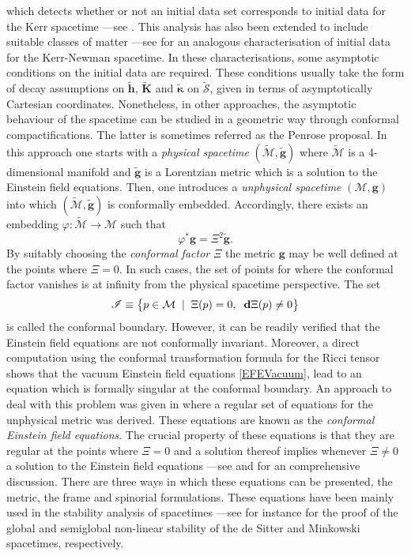 \documentclass[10pt,a4paper]{article}
\theoremstyle{plain}
\def\bmg{{\bm g}}
\def\bmh{{\bm h}}
\def\bmK{{\bm K}}
\begin{document}
 which detects whether or not an initial data set corresponds to
 initial data for the Kerr spacetime ---see
 \cite{BaeVal10a,BaeVal10b,BaeVal11b}.
This analysis has also been extended to include suitable classes of
matter ---see \cite{ColVal16} for an analogous characterisation of
initial data for the Kerr-Newman spacetime.  In these
characterisations, some asymptotic conditions on the initial data are
required. These conditions  usually take the form of decay assumptions
on   $\tilde{\bmh}$, $\tilde{\bmK}$ and $\tilde{\bm\kappa}$ on
$\tilde{\mathcal{S}}$, given in terms
of asymptotically Cartesian coordinates.  Nonetheless, in other
approaches, the asymptotic behaviour of the spacetime can be studied in
a geometric way through conformal compactifications. The latter is
sometimes referred as the Penrose proposal. In this approach one
starts with a \emph{physical spacetime}
$(\tilde{\mathcal{M}},\tilde{\bmg})$ where $\tilde{\mathcal{M}}$ is a
4-dimensional manifold and $\tilde{\bmg}$ is a Lorentzian metric which
is a solution to the Einstein field equations.  Then, one introduces a
\emph{unphysical spacetime} $(\mathcal{M},\bmg)$ into which
$(\tilde{\mathcal{M}},\tilde{\bmg})$ is conformally embedded.
Accordingly, there exists an embedding $\varphi: \tilde{\mathcal{M}}
\rightarrow \mathcal{M}$ such that
\begin{equation} \label{eqn:Chapter:Introduction:ConformalRescaling}
\varphi^{*}\bmg=\Xi^2\tilde{\bmg}.
\end{equation}
 By suitably choosing the \emph{conformal factor} $\Xi$ the metric
 $\bmg$ may be well defined at the points where $\Xi=0$. In such
 cases, the set of points for where the conformal factor vanishes is
 at infinity from the physical spacetime perspective.
\noindent The set
\[
 \mathscr{I} \equiv \big\{p \in \mathcal{M} \hspace{0.2cm}| \hspace{0.2cm} \Xi(p)=0
 , \hspace{0.2cm} \mathbf{d}\Xi(p) \neq0\big\}
\]
is called the conformal boundary.  However, it can be readily
verified that the Einstein field equations are not conformally
invariant. Moreover, a direct computation using the conformal
transformation formula for the Ricci tensor shows that the vacuum
Einstein field equations \eqref{EFEVacuum}, lead to an equation which
is formally singular at the conformal boundary.  An approach to deal
with this problem was given in \cite{Fri81a} where a regular set of
equations for the unphysical metric was derived. These equations are
known as the \emph{conformal Einstein field equations}.  The crucial
property of these equations is that they are regular at the points
where $\Xi=0$ and a solution thereof implies whenever $\Xi\neq 0$ a
solution to the Einstein field equations ---see \cite{Fri81a,Fri83}
and \cite{CFEbook} for an comprehensive discussion.  There are three
ways in which these equations can be presented, the metric, the frame
and spinorial formulations. These equations have been mainly used in
the stability analysis of spacetimes ---see for instance \cite{Fri86b,
  Fri86c} for the proof of the global and semiglobal non-linear
stability of the de Sitter and Minkowski spacetimes, respectively.
\end{document}
